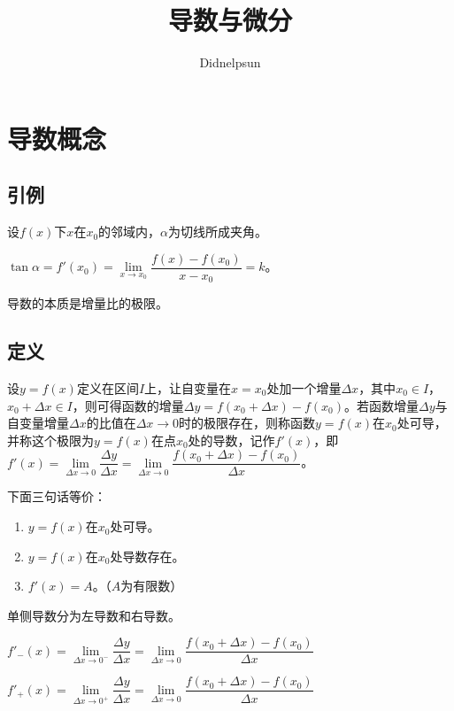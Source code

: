 \documentclass[UTF8, 12pt]{ctexart}
\author{Didnelpsun}
\title{导数与微分}
\date{}
\begin{document}
\renewcommand{\arraystretch}{1.5}
\maketitle
\thispagestyle{empty}
\tableofcontents
\thispagestyle{empty}
\newpage
\pagestyle{plain}
\setcounter{page}{1}
\section{导数概念}
\subsection{引例}

设$f(x)$下$x$在$x_0$的邻域内，$\alpha$为切线所成夹角。

$\tan\alpha=f'(x_0)=\lim\limits_{x\to x_0}\dfrac{f(x)-f(x_0)}{x-x_0}=k$。

导数的本质是增量比的极限。

\subsection{定义}

设$y=f(x)$定义在区间$I$上，让自变量在$x=x_0$处加一个增量$\Delta x$，其中$x_0\in I$，$x_0+\Delta x\in I$，则可得函数的增量$\Delta y=f(x_0+\Delta x)-f(x_0)$。若函数增量$\Delta y$与自变量增量$\Delta x$的比值在$\Delta x\to 0$时的极限存在，则称函数$y=f(x)$在$x_0$处可导，并称这个极限为$y=f(x)$在点$x_0$处的导数，记作$f'(x)$，即$f'(x)=\lim\limits_{\Delta x\to 0}\dfrac{\Delta y}{\Delta x}=\lim\limits_{\Delta x\to 0}\dfrac{f(x_0+\Delta x)-f(x_0)}{\Delta x}$。\medskip

下面三句话等价：

\begin{enumerate}
    \item $y=f(x)$在$x_0$处可导。
    \item $y=f(x)$在$x_0$处导数存在。
    \item $f'(x)=A$。（$A$为有限数）
\end{enumerate}

单侧导数分为左导数和右导数。\medskip

$f'_-(x)=\lim\limits_{\Delta x\to 0^-}\dfrac{\Delta y}{\Delta x}=\lim\limits_{\Delta x\to 0}\dfrac{f(x_0+\Delta x)-f(x_0)}{\Delta x}$

$f'_+(x)=\lim\limits_{\Delta x\to 0^+}\dfrac{\Delta y}{\Delta x}=\lim\limits_{\Delta x\to 0}\dfrac{f(x_0+\Delta x)-f(x_0)}{\Delta x}$\medskip
\end{document}
